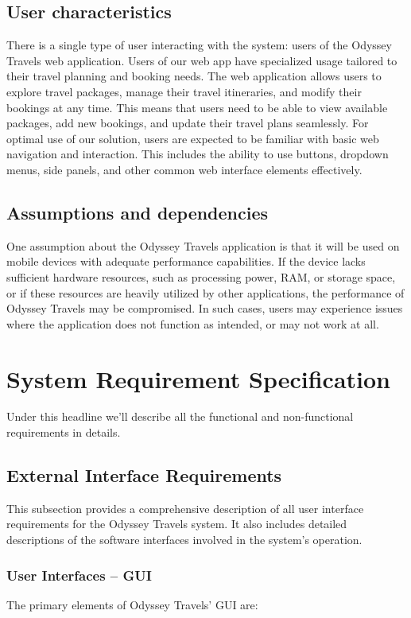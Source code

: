 \documentclass{scrreprt}
\begin{document}
\section {User characteristics}
There is a single type of user interacting with the system: users of the Odyssey Travels web application. Users of our web app have specialized usage tailored to their travel planning and booking needs.
The web application allows users to explore travel packages, manage their travel itineraries, and modify their bookings at any time. This means that users need to be able to view available packages, add new bookings, and update their travel plans seamlessly.
For optimal use of our solution, users are expected to be familiar with basic web navigation and interaction. This includes the ability to use buttons, dropdown menus, side panels, and other common web interface elements effectively.
\section{Assumptions and dependencies}
One assumption about the Odyssey Travels application is that it will be used on mobile devices with adequate performance capabilities. If the device lacks sufficient hardware resources, such as processing power, RAM, or storage space, or if these resources are heavily utilized by other applications, the performance of Odyssey Travels may be compromised. In such cases, users may experience issues where the application does not function as intended, or may not work at all.


\chapter{System Requirement Specification}
Under this headline we’ll describe all the functional and non-functional requirements in details.

\section{External Interface Requirements}
This subsection provides a comprehensive description of all user interface requirements for the Odyssey Travels system. It also includes detailed descriptions of the software interfaces involved in the system's operation.
\subsection{User Interfaces – GUI}
The primary elements of Odyssey Travels' GUI are:
\end{document}
